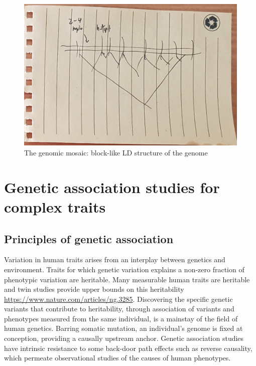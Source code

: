 \begin{outline}
\begin{figure}
    \centering
    \includegraphics[width=1.0\textwidth,page=1]{mainmatter/figures/chapter_01/fig_mockup_haplotypeBlocks_Screenshot 2020-05-21 at 17.08.33.png}
    \caption{The genomic mosaic: block-like \gls{LD} structure of the genome}
    \label{fig:intro_haplotypeBlocks}
\end{figure}

\section{Genetic association studies for complex traits}

\subsection{Principles of genetic association}

\1 Variation in human traits arises from an interplay between genetics and environment.
Traits for which genetic variation explains a non-zero fraction of phenotypic variation are heritable.
Many measurable human traits are heritable and twin studies provide upper bounds on this heritability \url{https://www.nature.com/articles/ng.3285}.
Discovering the specific genetic variants that contribute to heritability, through association of variants and phenotypes measured from the same individual, is a mainstay of the field of human genetics.
Barring somatic mutation, an individual's genome is fixed at conception, providing a causally upstream anchor.
Genetic association studies have intrinsic resistance to some back-door path effects such as reverse causality, which permeate observational studies of the causes of human phenotypes.


\end{outline}
